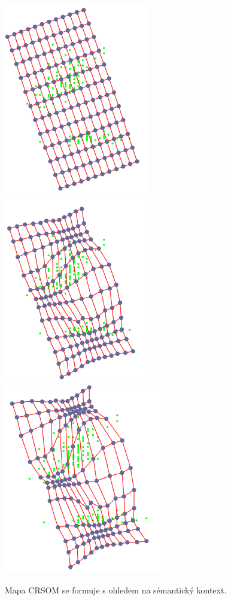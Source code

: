 \documentclass[thesis=M,czech]{FITthesis}[2012/06/26]
\begin{document}
\begin{figure}[htp]
    \centering
    
    \includegraphics[width=.32\textwidth]{cr1.png}
    \includegraphics[width=.32\textwidth]{cr2.png}
    \includegraphics[width=.32\textwidth]{cr3.png}
    \caption{Mapa CRSOM se formuje s ohledem na sémantický kontext.}
    \label{fig:cr}
\end{figure}
\end{document}
